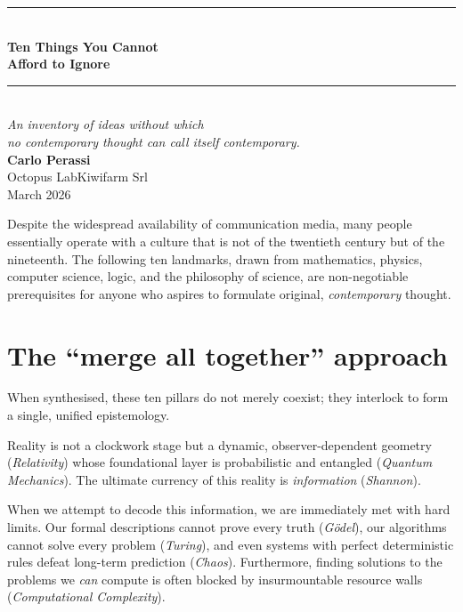\documentclass[11pt,a4paper]{article}
\begin{document}
	
	\thispagestyle{empty}
	\vspace*{2.5cm}
	
	\begin{center}
		{\color{accent}\rule{0.4\textwidth}{1pt}}\\[1.2em]
		{\fontsize{28}{34}\selectfont\bfseries\color{deep}
			Ten Things You Cannot\\[0.15em] Afford to Ignore}\\[1.2em]
		{\color{accent}\rule{0.4\textwidth}{1pt}}\\[2em]
		{\large\color{steel}\itshape
			An inventory of ideas without which\\[0.3em]
			no contemporary thought can call itself contemporary.}\\[3em]
		{\color{deep}\bfseries Carlo Perassi}\\[0.3em]
		{\small\color{steel} Octopus Lab\enspace\textperiodcentered\enspace Kiwifarm Srl}\\[0.3em]
		{\small\color{steel} March 2026}
	\end{center}
	
	\vfill
	
	\noindent\textcolor{steel}{\small
		Despite the widespread availability of communication media, many people
		essentially operate with a culture that is not of the twentieth century
		but of the nineteenth. The following ten landmarks, drawn from
		mathematics, physics, computer science, logic, and the philosophy of
		science, are non-negotiable prerequisites for anyone who aspires to
		formulate original, \emph{contemporary} thought.}
	
	\newpage

\section*{The ``merge all together'' approach}

When synthesised, these ten pillars do not merely coexist; they interlock to form a single, unified epistemology. 

Reality is not a clockwork stage but a dynamic, observer-dependent geometry (\emph{Relativity}) whose foundational layer is probabilistic and entangled (\emph{Quantum Mechanics}). The ultimate currency of this reality is \emph{information} (\emph{Shannon}). 

When we attempt to decode this information, we are immediately met with hard limits. Our formal descriptions cannot prove every truth (\emph{G\"odel}), our algorithms cannot solve every problem (\emph{Turing}), and even systems with perfect deterministic rules defeat long-term prediction (\emph{Chaos}). Furthermore, finding solutions to the problems we \emph{can} compute is often blocked by insurmountable resource walls (\emph{Computational Complexity}).
\end{document}
